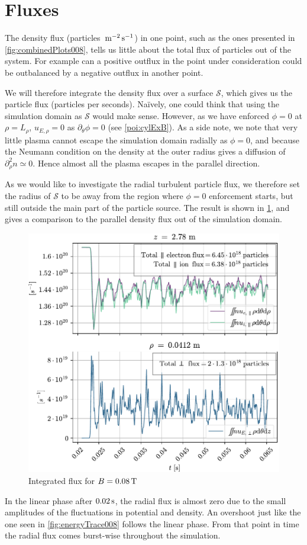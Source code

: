 \section{Fluxes}
\label{sec:fluxes}
%
The density flux (particles $\, \text{m}^{-2}\, \text{s}^{-1}$) in one point, such as the ones presented in \cref{fig:combinedPlots008}, tells us little about the total flux of particles out of the system.
For example can a positive outflux in the point under consideration could be outbalanced by a negative outflux in another point.

We will therefore integrate the density flux over a surface $\mathcal{S}$, which gives us the particle flux (particles per seconds).
Na{\"i}vely, one could think that using the simulation domain as $\mathcal{S}$ would make sense.
However, as we have enforced $\phi=0$ at $\rho=L_\rho$, $u_{E,\rho}=0$ as $\partial_\theta \phi=0$ (see \cref{poi:cylExB}).
As a side note, we note that very little plasma cannot escape the simulation domain radially as $\phi=0$, and because the Neumann condition on the density at the outer radius gives a diffusion of $\partial_\rho^2 n \simeq 0$.
Hence almost all the plasma escapes in the parallel direction.

As we would like to investigate the radial turbulent particle flux, we therefore set the radius of $\mathcal{S}$ to be away from the region where $\phi=0$ enforcement starts, but still outside the main part of the particle source.
The result is shown in \cref{fig:flux0008}, and gives a comparison to the parallel density flux out of the simulation domain.
%
\begin{figure}[htb]
    \centering
    \includegraphics{fig/results/totalFlux/flux0008}
    \caption{Integrated flux for $B=0.08\, \text{T}$}
    \label{fig:flux0008}
\end{figure}
%
In the linear phase after $0.02\, \text{s}$, the radial flux is almost zero due to the small amplitudes of the fluctuations in potential and density.
An overshoot just like the one seen in \cref{fig:energyTrace008} follows the linear phase.
From that point in time the radial flux comes burst-wise throughout the simulation.

